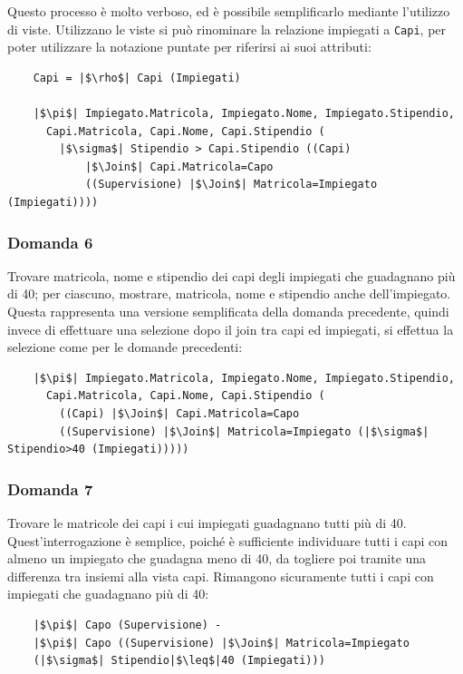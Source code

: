 \documentclass{article}
\numberwithin{equation}{subsection}
\begin{document}
Questo processo è molto verboso, ed è possibile semplificarlo mediante l'utilizzo di viste. Utilizzano le viste si può rinominare la relazione impiegati a \verb|Capi|, per poter utilizzare la notazione puntate 
per riferirsi ai suoi attributi:
\begin{verbatim}
    Capi = |$\rho$| Capi (Impiegati) 

    |$\pi$| Impiegato.Matricola, Impiegato.Nome, Impiegato.Stipendio, 
      Capi.Matricola, Capi.Nome, Capi.Stipendio (
        |$\sigma$| Stipendio > Capi.Stipendio ((Capi)
            |$\Join$| Capi.Matricola=Capo
            ((Supervisione) |$\Join$| Matricola=Impiegato (Impiegati))))
\end{verbatim}

\subsubsection*{Domanda 6}

Trovare matricola, nome e stipendio dei capi degli impiegati che guadagnano più di 40; per ciascuno, mostrare, matricola, nome e stipendio anche dell'impiegato. Questa rappresenta una versione semplificata 
della domanda precedente, quindi invece di effettuare una selezione dopo il join tra capi ed impiegati, si effettua la selezione come per le domande precedenti:

\begin{verbatim}
    |$\pi$| Impiegato.Matricola, Impiegato.Nome, Impiegato.Stipendio, 
      Capi.Matricola, Capi.Nome, Capi.Stipendio (
        ((Capi) |$\Join$| Capi.Matricola=Capo
        ((Supervisione) |$\Join$| Matricola=Impiegato (|$\sigma$| Stipendio>40 (Impiegati)))))
\end{verbatim}

\subsubsection*{Domanda 7}

Trovare le matricole dei capi i cui impiegati guadagnano tutti più di 40. Quest'interrogazione è semplice, poiché è sufficiente individuare tutti i capi con almeno un impiegato che guadagna meno di 40, da togliere poi 
tramite una differenza tra insiemi alla vista capi. Rimangono sicuramente tutti i capi con impiegati che guadagnano più di 40:
\begin{verbatim}
    |$\pi$| Capo (Supervisione) -
    |$\pi$| Capo ((Supervisione) |$\Join$| Matricola=Impiegato
    (|$\sigma$| Stipendio|$\leq$|40 (Impiegati)))

\end{verbatim}
\end{document}
